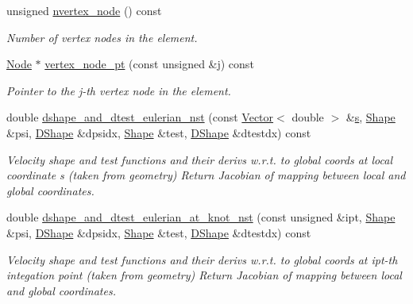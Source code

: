 \begin{DoxyCompactItemize}
unsigned \hyperlink{classoomph_1_1PRefineableGeneralisedNewtonianQCrouzeixRaviartElement_ad41a2cd5f7ba136c2db47404e23b3bff}{nvertex\+\_\+node} () const
\begin{DoxyCompactList}\small\item\em Number of vertex nodes in the element. \end{DoxyCompactList}\item 
\hyperlink{classoomph_1_1Node}{Node} $\ast$ \hyperlink{classoomph_1_1PRefineableGeneralisedNewtonianQCrouzeixRaviartElement_ae2fe7e53f670c3bbe10bfd505ff0e198}{vertex\+\_\+node\+\_\+pt} (const unsigned \&j) const
\begin{DoxyCompactList}\small\item\em Pointer to the j-\/th vertex node in the element. \end{DoxyCompactList}\item 
double \hyperlink{classoomph_1_1PRefineableGeneralisedNewtonianQCrouzeixRaviartElement_a4cc8b7e4932fe27129f5e6b4dcba07dc}{dshape\+\_\+and\+\_\+dtest\+\_\+eulerian\+\_\+nst} (const \hyperlink{classoomph_1_1Vector}{Vector}$<$ double $>$ \&\hyperlink{cfortran_8h_ab7123126e4885ef647dd9c6e3807a21c}{s}, \hyperlink{classoomph_1_1Shape}{Shape} \&psi, \hyperlink{classoomph_1_1DShape}{D\+Shape} \&dpsidx, \hyperlink{classoomph_1_1Shape}{Shape} \&test, \hyperlink{classoomph_1_1DShape}{D\+Shape} \&dtestdx) const
\begin{DoxyCompactList}\small\item\em Velocity shape and test functions and their derivs w.\+r.\+t. to global coords at local coordinate s (taken from geometry) Return Jacobian of mapping between local and global coordinates. \end{DoxyCompactList}\item 
double \hyperlink{classoomph_1_1PRefineableGeneralisedNewtonianQCrouzeixRaviartElement_a203b2ab3f584e3283f793724b13f1838}{dshape\+\_\+and\+\_\+dtest\+\_\+eulerian\+\_\+at\+\_\+knot\+\_\+nst} (const unsigned \&ipt, \hyperlink{classoomph_1_1Shape}{Shape} \&psi, \hyperlink{classoomph_1_1DShape}{D\+Shape} \&dpsidx, \hyperlink{classoomph_1_1Shape}{Shape} \&test, \hyperlink{classoomph_1_1DShape}{D\+Shape} \&dtestdx) const
\begin{DoxyCompactList}\small\item\em Velocity shape and test functions and their derivs w.\+r.\+t. to global coords at ipt-\/th integation point (taken from geometry) Return Jacobian of mapping between local and global coordinates. \end{DoxyCompactList}\item 

\end{DoxyCompactItemize}
